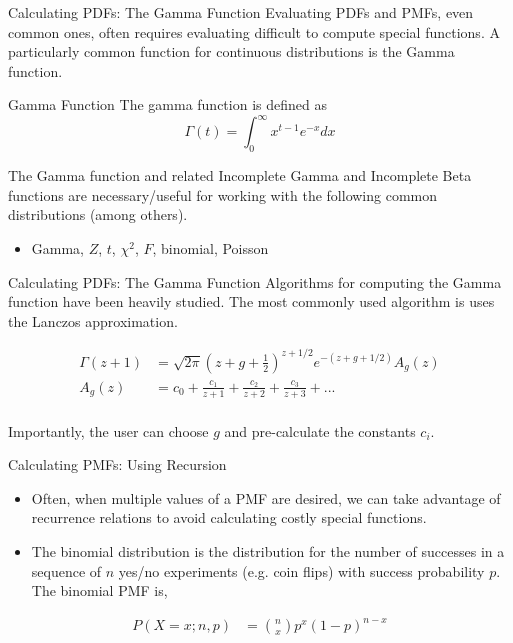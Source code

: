 \documentclass[serif,xcolor=pdftex,dvipsnames,table,hyperref={bookmarks=false,breaklinks}]{beamer}
\begin{document}
\begin{frame}[t]{Calculating PDFs: The Gamma Function}
	Evaluating PDFs and PMFs, even common ones, often requires evaluating difficult to compute special functions. A particularly common function for continuous distributions is the Gamma function.

	\pause
	\begin{block}{Gamma Function}
		The gamma function is defined as
		$$\Gamma(t) = \int_0^\infty x^{t-1}e^{-x}dx$$
	\end{block}

	\pause
	The Gamma function and related Incomplete Gamma and Incomplete Beta functions are necessary/useful for working with the following common distributions (among others).
	\begin{itemize}[<+->]
		\item Gamma, $Z$, $t$, $\chi^2$, $F$, binomial, Poisson
	\end{itemize}
\end{frame}

\begin{frame}[t]{Calculating PDFs: The Gamma Function}
	Algorithms for computing the Gamma function have been heavily studied. The most commonly used algorithm is uses the Lanczos approximation.

	\pause
	\begin{align*}
		\Gamma(z+1) &= \sqrt{2\pi}\left(z + g + \frac{1}{2}\right)^{z+1/2}e^{-(z+g+1/2)}A_g(z)\\
		A_g(z) &= c_0 + \frac{c_1}{z+1} + \frac{c_2}{z+2} + \frac{c_3}{z+3} + ... \\
	\end{align*}

	\pause
	Importantly, the user can choose $g$ and pre-calculate the constants $c_i$.
\end{frame}

\begin{frame}[t]{Calculating PMFs: Using Recursion}
	\begin{itemize}[<+->]
		\item Often, when multiple values of a PMF are desired, we can take advantage of recurrence relations to avoid calculating costly special functions.
		\item The binomial distribution is the distribution for the number of successes in a sequence of $n$ yes/no experiments (e.g. coin flips) with success probability $p$. The binomial PMF is,
	\end{itemize}
	\pause
	\begin{align*}
		P(X = x; n, p) &= {{n}\choose{x}}p^x(1-p)^{n-x}
	\end{align*}
\end{frame}
\end{document}
